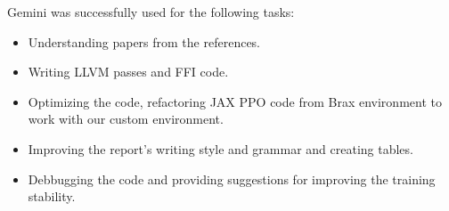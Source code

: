 \documentclass{article}
\theoremstyle{plain}
\theoremstyle{definition}
\theoremstyle{remark}
\begin{document}
Gemini was successfully used for the following tasks:

\begin{itemize}
    \item Understanding papers from the references.
    \item Writing LLVM passes and FFI code.
    \item Optimizing the code, refactoring JAX PPO code from Brax environment to work with our custom environment.
    \item Improving the report's writing style and grammar and creating tables.
    \item Debbugging the code and providing suggestions for improving the training stability.
\end{itemize}

\end{document}
